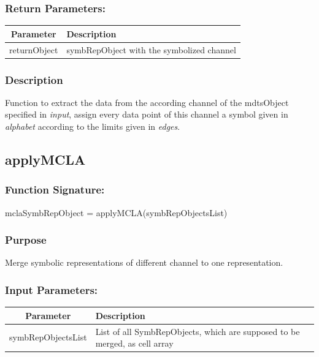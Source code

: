 \documentclass[a4]{scrreprt}
\begin{document}
\subsubsection{Return Parameters:}

\begin{longtabu} to \textwidth {|c|X|}
	\hline
	\textbf{Parameter} & \textbf{Description} \\ \hline
	\endhead
	returnObject  &  symbRepObject with the symbolized channel \\ \hline
\end{longtabu}

\subsubsection{Description}

Function to extract the data from the according channel of the mdtsObject specified in \textit{input}, assign every data point of this channel a symbol given in \textit{alphabet} according to the limits given in \textit{edges}.

\subsection{applyMCLA}

\subsubsection{Function Signature:}

\begin{center}
	mclaSymbRepObject = applyMCLA(symbRepObjectsList)
\end{center}

\subsubsection{Purpose}

Merge symbolic representations of different channel to one representation.

\subsubsection{Input Parameters:}

\begin{longtabu} to \textwidth {|c|X|}
	\hline
	\textbf{Parameter} & \textbf{Description} \\ \hline
	\endhead
	symbRepObjectsList & List of all SymbRepObjects, which are supposed to be merged, as cell array \\ \hline
\end{longtabu}
\end{document}
